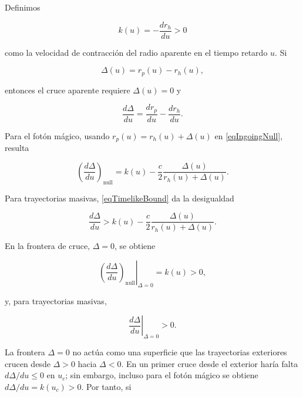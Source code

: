 \documentclass[
aps,
prd,
reprint,
superscriptaddress,
nofootinbib,
amsmath,
amssymb
]{revtex4-2}
\begin{document}
Definimos

\begin{equation}
k(u)=
-
\frac{dr_h}{du}
>0
\label{eqRetreatSpeed}
\end{equation}

como la velocidad de contracción del radio aparente en el tiempo retardo $u$. Si

\begin{equation}
\Delta(u)=r_p(u)-r_h(u),
\label{eqGapDefinition}
\end{equation}

entonces el cruce aparente requiere $\Delta(u)=0$ y

\begin{equation}
\frac{d\Delta}{du}
=
\frac{dr_p}{du}
-
\frac{dr_h}{du}.
\label{eqGapEvolution}
\end{equation}

Para el fotón mágico, usando $r_p(u)=r_h(u)+\Delta(u)$ en \eqref{eqIngoingNull}, resulta

\begin{equation}
\left(
\frac{d\Delta}{du}
\right)_{\mathrm{null}}
=
k(u)
-
\frac{c}{2}
\frac{\Delta(u)}
{r_h(u)+\Delta(u)}.
\label{eqGapNull}
\end{equation}

Para trayectorias masivas, \eqref{eqTimelikeBound} da la desigualdad

\begin{equation}
\frac{d\Delta}{du}
>
k(u)
-
\frac{c}{2}
\frac{\Delta(u)}
{r_h(u)+\Delta(u)}.
\label{eqGapInequalityTimelike}
\end{equation}

En la frontera de cruce, $\Delta=0$, se obtiene

\begin{equation}
\left.
\left(
\frac{d\Delta}{du}
\right)_{\mathrm{null}}
\right|_{\Delta=0}
=
k(u)>0,
\label{eqNullRepulsion}
\end{equation}

y, para trayectorias masivas,

\begin{equation}
\left.
\frac{d\Delta}{du}
\right|_{\Delta=0}
>0.
\end{equation}

La frontera $\Delta=0$ no actúa como una superficie que las trayectorias exteriores crucen desde $\Delta>0$ hacia $\Delta<0$. En un primer cruce desde el exterior haría falta $d\Delta/du\leq0$ en $u_c$; sin embargo, incluso para el fotón mágico se obtiene $d\Delta/du=k(u_c)>0$. Por tanto, si
\end{document}

